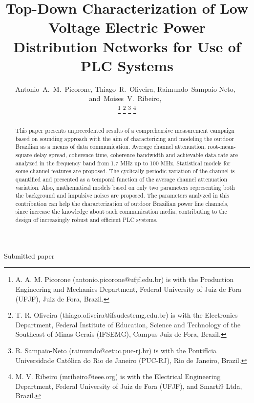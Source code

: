 \documentclass[journal]{IEEEtran}
\begin{document}
\title{Top-Down Characterization of Low Voltage Electric Power Distribution Networks for Use of PLC Systems}

\author{Antonio~A.~M.~Picorone,
        Thiago~R.~Oliveira,  
        Raimundo~Sampaio-Neto,~     
        and~Moises~V.~Ribeiro,~%

 \thanks{A. A. M. Picorone (antonio.picorone@ufjf.edu.br) is with the Production Engineering and Mechanics Department, Federal University of Juiz de Fora (UFJF), Juiz de Fora, Brazil.}%
 \thanks{T. R. Oliveira (thiago.oliveira@ifsudestemg.edu.br) is with the Electronics Department, Federal Institute of Education, Science and Technology of the Southeast of Minas Gerais (IFSEMG), Campus Juiz de Fora, Brazil.}%
 \thanks{R. Sampaio-Neto (raimundo@cetuc.puc-rj.br) is with the Pontif\'icia Universidade Cat\'olica do Rio de Janeiro (PUC-RJ), Rio de Janeiro, Brazil.}%
\thanks{M. V. Ribeiro (mribeiro@ieee.org) is with the Electrical Engineering Department,
Federal University of Juiz de Fora (UFJF), and Smarti9 Ltda, Brazil.}%
}

%
{Submitted paper}

\maketitle

\begin{abstract}
This paper presents unprecedented results of a comprehensive measurement campaign based on sounding approach with the aim of characterizing and modeling the outdoor Brazilian as a means of data communication. Average channel attenuation, root-mean-square delay spread, coherence time, coherence bandwidth and achievable data rate are analyzed in the frequency band from 1.7 MHz up to 100 MHz. Statistical models for some channel features are proposed. The cyclically periodic variation of the channel is quantified and presented as a temporal function of the average channel attenuation variation. Also, mathematical models based on only two parameters representing both the background and impulsive noises are proposed. The parameters analyzed in this contribution can help the characterization of outdoor Brazilian power line channels, since increase the knowledge about such communication media, contributing to the design of increasingly robust and efficient PLC systems.
\end{abstract}
\end{document}
